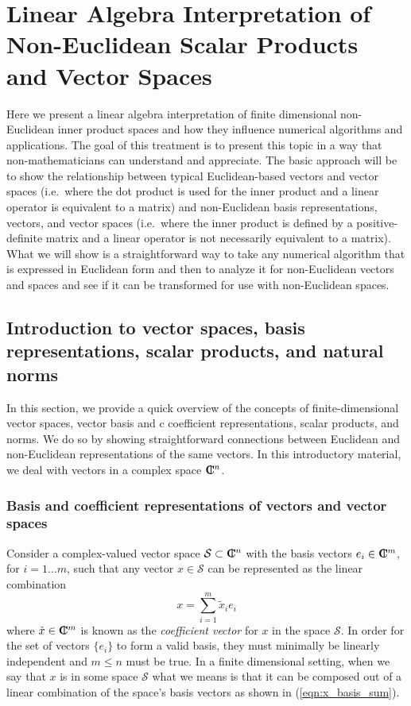 \section{Linear Algebra Interpretation of Non-Euclidean Scalar Products and Vector Spaces}

Here we present a linear algebra interpretation of finite dimensional
non-Euclidean inner product spaces and how they influence numerical algorithms
and applications.  The goal of this treatment is to present this topic in a
way that non-mathematicians can understand and appreciate.  The basic approach
will be to show the relationship between typical Euclidean-based vectors and
vector spaces (i.e.\ where the dot product is used for the inner product and a
linear operator is equivalent to a matrix) and non-Euclidean basis
representations, vectors, and vector spaces (i.e.\ where the inner product is
defined by a positive-definite matrix and a linear operator is not
necessarily equivalent to a matrix).  What we will show is a straightforward
way to take any numerical algorithm that is expressed in Euclidean form and
then to analyze it for non-Euclidean vectors and spaces and see if it can be
transformed for use with non-Euclidean spaces.

\subsection{Introduction to vector spaces, basis representations, scalar products, and natural norms}

In this section, we provide a quick overview of the concepts of
finite-dimensional vector spaces, vector basis and c coefficient
representations, scalar products, and norms.  We do so by showing
straightforward connections between Euclidean and non-Euclidean representations
of the same vectors.  In this introductory material, we deal with vectors in a
complex space $\mbox{\textbf{C}}\hspace{-1.1ex}\mbox{l}\hspace{0.4ex}^n$.

\subsubsection{Basis and coefficient representations of vectors and vector spaces}

Consider a complex-valued vector space $\mathcal{S} {}\subset \mbox{\textbf{C}}\hspace{-1.1ex}\mbox{l}\hspace{0.4ex}^n$ with
the basis vectors $e_i\in\mbox{\textbf{C}}\hspace{-1.1ex}\mbox{l}\hspace{0.4ex}^m$, for $i=1\ldots{}m$, such that any vector
$x\in\mathcal{S}$ can be represented as the linear combination
%
\begin{equation}
x = \sum_{i=1}^{m} \tilde{x}_i e_i
\label{eqn:x_basis_sum}
\end{equation}
%
where $\tilde{x}\in\mbox{\textbf{C}}\hspace{-1.1ex}\mbox{l}\hspace{0.4ex}^m$ is known as the {}\textit{coefficient vector} for
$x$ in the space $\mathcal{S}$.  In order for the set of vectors $\{e_i\}$ to
form a valid basis, they must minimally be linearly independent and $m {}\le
n$ must be true.  In a finite dimensional setting, when we say that $x$ is in
some space $\mathcal{S}$ what we means is that it can be composed out of a
linear combination of the space's basis vectors as shown in
(\ref{eqn:x_basis_sum}).

